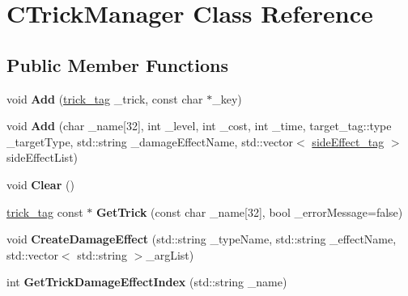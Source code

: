 \hypertarget{class_c_trick_manager}{}\section{C\+Trick\+Manager Class Reference}
\label{class_c_trick_manager}
\subsection*{Public Member Functions}
\begin{DoxyCompactItemize}
\item 
void {\bfseries Add} (\hyperlink{structtrick__tag}{trick\+\_\+tag} \+\_\+trick, const char $\ast$\+\_\+key)\hypertarget{class_c_trick_manager_a4ff14d768273432dbb42c4107b9788f7}{}\label{class_c_trick_manager_a4ff14d768273432dbb42c4107b9788f7}

\item 
void {\bfseries Add} (char \+\_\+name\mbox{[}32\mbox{]}, int \+\_\+level, int \+\_\+cost, int \+\_\+time, target\+\_\+tag\+::type \+\_\+target\+Type, std\+::string \+\_\+damage\+Effect\+Name, std\+::vector$<$ \hyperlink{structside_effect__tag}{side\+Effect\+\_\+tag} $>$ side\+Effect\+List)\hypertarget{class_c_trick_manager_a977362fc3b7b6a5ac2d8cf790a516e9d}{}\label{class_c_trick_manager_a977362fc3b7b6a5ac2d8cf790a516e9d}

\item 
void {\bfseries Clear} ()\hypertarget{class_c_trick_manager_a3cdaa23673efbd07cd9192e1edbefb4c}{}\label{class_c_trick_manager_a3cdaa23673efbd07cd9192e1edbefb4c}

\item 
\hyperlink{structtrick__tag}{trick\+\_\+tag} const $\ast$ {\bfseries Get\+Trick} (const char \+\_\+name\mbox{[}32\mbox{]}, bool \+\_\+error\+Message=false)\hypertarget{class_c_trick_manager_a6df35ab36d8ccdf5915acfe58792cb88}{}\label{class_c_trick_manager_a6df35ab36d8ccdf5915acfe58792cb88}

\item 
void {\bfseries Create\+Damage\+Effect} (std\+::string \+\_\+type\+Name, std\+::string \+\_\+effect\+Name, std\+::vector$<$ std\+::string $>$\+\_\+arg\+List)\hypertarget{class_c_trick_manager_a1331fd57ddf7d938a1e3312686bf78e5}{}\label{class_c_trick_manager_a1331fd57ddf7d938a1e3312686bf78e5}

\item 
int {\bfseries Get\+Trick\+Damage\+Effect\+Index} (std\+::string \+\_\+name)\hypertarget{class_c_trick_manager_a855acdc647cb57daf01610de4827b6cf}{}\label{class_c_trick_manager_a855acdc647cb57daf01610de4827b6cf}


\end{DoxyCompactItemize}
